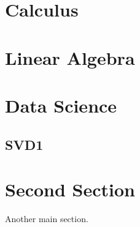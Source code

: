 \documentclass{article}
\begin{document}

\section{Calculus}

\section{Linear Algebra}

\section{Data Science}
\subsection{SVD1}



\section{Second Section}
Another main section.
\end{document}
